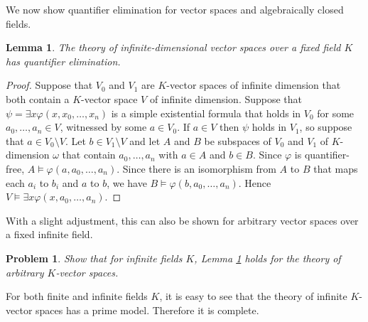 \documentclass[10pt]{amsart}
\newtheorem{lemma}[theorem]{Lemma}
\newtheorem{problem}[theorem]{Problem}
\theoremstyle{definition}
\theoremstyle{remark}
\begin{document}
We now show quantifier elimination for vector spaces and algebraically closed fields. 

\begin{lemma} \label{quantifier elimination for infinite-dimensional vector spaces} 
The theory of infinite-dimensional vector spaces over a fixed field $K$ has quantifier elimination. 
\end{lemma} 
\begin{proof} 
Suppose that $V_0$ and $V_1$ are $K$-vector spaces of infinite dimension that both contain a $K$-vector space $V$ of infinite dimension. %
Suppose that $\psi=\exists x \varphi(x,x_0,\dots,x_n)$ is a simple existential formula that holds in $V_0$ for some $a_0,\dots,a_n\in V$, witnessed by some $a\in V_0$. If $a\in V$ then $\psi$ holds in $V_1$, so suppose that $a\in V_0\setminus V$. 
Let $b\in V_1\setminus V$ and let $A$ and $B$ be subspaces of $V_0$ and $V_1$ of $K$-dimension $\omega$ that contain $a_0,\dots,a_n$ with $a\in A$ and $b\in B$. Since $\varphi$ is quantifier-free, $A\models \varphi(a,a_0,\dots,a_n)$. Since there is an isomorphism from $A$ to $B$ that maps each $a_i$ to $b_i$ and $a$ to $b$, we have $B\models \varphi(b,a_0,\dots,a_n)$. Hence $V\models \exists x \varphi(x,a_0,\dots,a_n)$. 
\end{proof} 

With a slight adjustment, this can also be shown for arbitrary vector spaces over a fixed infinite field. 

\begin{problem} 
Show that for infinite fields $K$, Lemma \ref{quantifier elimination for infinite-dimensional vector spaces} holds for the theory of arbitrary $K$-vector spaces. 
\end{problem} 

For both finite and infinite fields $K$, it is easy to see that the theory of infinite $K$-vector spaces has a prime model. Therefore it is complete. 
\end{document}
